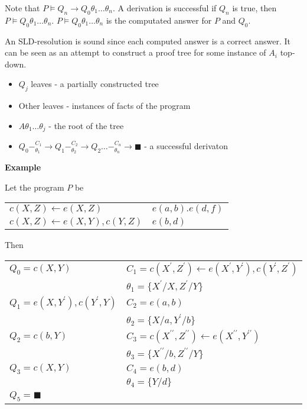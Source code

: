 \documentclass{article}
\begin{document}
Note that $P\models Q_n\rightarrow Q_0\theta_1\ldots\theta_n$. A derivation is successful if $Q_n$ is true, then $P\models Q_0\theta_1\ldots\theta_n$. $P\models Q_0\theta_1\ldots\theta_n$ is the computated answer for $P$ and $Q_0$.

An SLD-resolution is sound since each computed answer is a correct answer. It can be seen as an attempt to construct a proof tree for some instance of $A_i$ top-down.
\begin{itemize}
    \item $Q_j$ leaves - a partially constructed tree
    \item Other leaves - instances of facts of the program
    \item $A\theta_1\ldots\theta_j$ - the root of the tree
    \item $Q_0-_{\theta_1}^{C_1}\rightarrow Q_1-_{\theta_2}^{C_2}\rightarrow Q_2\ldots-_{\theta_n}^{C_n}\rightarrow \blacksquare$ - a successful derivaton
\end{itemize}

\pagebreak

\textbf{Example}

Let the program $P$ be

\begin{tabular}{l l}
    $c(X,Z) \leftarrow e(X,Z)$ & $e(a,b). e(d,f)$
    \\
    $c(X,Z) \leftarrow e(X,Y),c(Y,Z)$ & $e(b,d)$
\end{tabular}

Then

\begin{tabular}{l | l}
    $Q_0=c(X,Y)$ & $C_1=c(X^\prime, Z^\prime)\leftarrow e(X^\prime,Y^\prime),c(Y^\prime,Z^\prime)$
    \\
    & $\theta_1=\{X^\prime/X, Z^\prime/Y\}$
    \\\hline
    $Q_1=e(X,Y^\prime), c(Y^\prime,Y)$ & $C_2=e(a,b)$
    \\
    & $\theta_2=\{X/a, Y^\prime/b\}$
    \\\hline
    $Q_2=c(b,Y)$ & $C_3=c(X^{\prime\prime}, Z^{\prime\prime})\leftarrow e(X^{\prime\prime},Y^{\prime\prime})$
    \\
    & $\theta_3=\{X^{\prime\prime}/b, Z^{\prime\prime}/Y\}$
    \\\hline
    $Q_3=c(X,Y)$ & $C_4=e(b,d)$
    \\
    & $\theta_4=\{Y/d\}$
    \\\hline
    $Q_5=\blacksquare$
\end{tabular}
\end{document}
